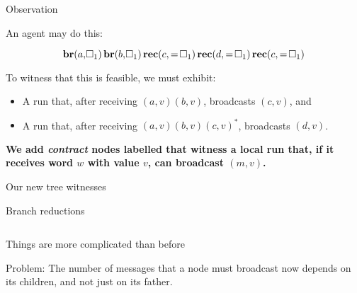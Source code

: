 \documentclass{beamer}
\newcommand{\br}{\mathbf{br}}
\newcommand{\rec}{\mathbf{rec}}
\newcommand{\reg}{\hspace{-0.5mm}\square}
\begin{document}
\begin{frame}{Observation}
	
	An agent may do this:
	
	\[ \br(a, \reg_1) \, \br(b, \reg_1) \, \rec(c, =\reg_1)  \,\rec(d, =\reg_1) \, \rec(c, =\reg_1)\]
	\pause
	
	To witness that this is feasible, we must exhibit: 
	\begin{itemize}
		\item A run that, after receiving $(a, v) (b, v)$, broadcasts $(c,v)$, and
		
		\item A run that, after receiving $(a,v) (b,v) (c,v)^*$, broadcasts $(d,v)$.
	\end{itemize}
\vspace{0.5cm}

	\pause
	\textbf{We add \emph{contract} nodes labelled  that witness a local run that, if it receives word $w$ with value $v$, can broadcast $(m,v)$.}
\end{frame}

\begin{frame}{Our new tree witnesses}
	
	
	
\end{frame}


\begin{frame}{Branch reductions}
	\begin{columns}
		\begin{column}{0.5\textwidth}
			
		\end{column}
		
		\begin{column}{0.5\textwidth}
			
		\end{column}
	\end{columns}
	
\end{frame}

\begin{frame}{Things are more complicated than before}
	\begin{center}
	
	\end{center}

	Problem: The number of messages that a node must broadcast now depends on its  children, and not just on its father.
\end{frame}
\end{document}
